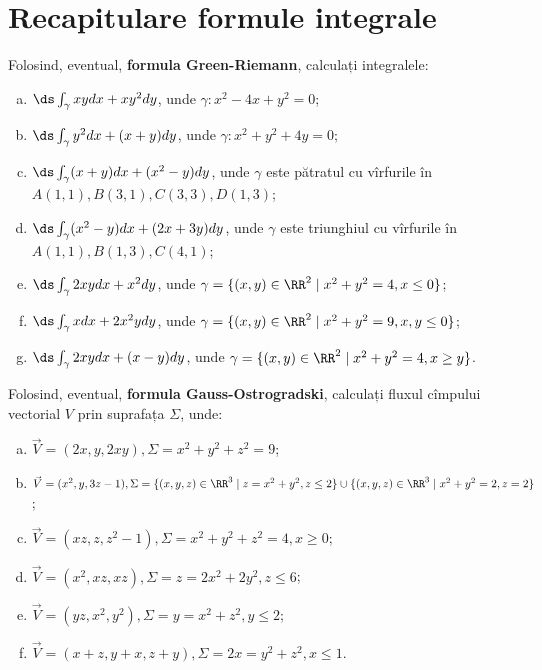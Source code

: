 
\chapter{Recapitulare formule integrale}

\indent\indent Folosind, eventual, \textbf{formula Green-Riemann}, calculați integralele:
\begin{enumerate}[(a)]
    \item $ \ds\int_\gamma xydx + xy^2 dy$, unde $ \gamma: x^2 - 4x + y^2 = 0 $;
    \item $ \ds\int_\gamma y^2 dx + (x + y) dy $, unde $ \gamma: x^2 + y^2 + 4y = 0 $;
    \item $ \ds\int_\gamma (x + y) dx + (x^2 - y) dy $, unde $ \gamma $ este pătratul cu vîrfurile în $ A(1,1), B(3,1), C(3,3), D(1,3) $;
    \item $ \ds\int_\gamma (x^2 - y) dx + (2x + 3y) dy $, unde $ \gamma $ este triunghiul cu vîrfurile în $ A(1, 1), B(1, 3), C(4,1) $;
    \item $ \ds\int_\gamma 2xydx + x^2 dy $, unde $ \gamma = \{ (x, y) \in \RR^2 \mid x^2 + y^2 = 4, x \leq 0 \} $;
    \item $ \ds\int_\gamma xdx + 2x^2y dy $, unde $ \gamma = \{ (x, y) \in \RR^2 \mid x^2 + y^2 = 9, x, y \leq 0 \} $;
    \item $ \ds\int_\gamma 2xydx + (x - y) dy $, unde $ \gamma = \{ (x, y) \in \RR^2 \mid x^2 + y^2 = 4, x \geq y \} $.
\end{enumerate}

\vspace{0.3cm}

Folosind, eventual, \textbf{formula Gauss-Ostrogradski}, calculați fluxul cîmpului vectorial $ V $
prin suprafața $ \Sigma $, unde:
\begin{enumerate}[(a)]
    \item $ \vec{V} = (2x, y, 2xy), \Sigma = x^2 + y^2 + z^2 = 9 $;
    \item $ \vec{V} = (x^2, y, 3z - 1), \Sigma = \{ (x, y, z) \in \RR^3 \mid z = x^2 + y^2, z \leq 2 \} \cup \{ (x, y, z) \in \RR^3 \mid x^2 + y^2 = 2, z = 2 \} $;
    \item $ \vec{V} = (xz, z, z^2 - 1), \Sigma = x^2 + y^2 + z^2 = 4, x \geq 0 $;
    \item $ \vec{V} = (x^2, xz, xz), \Sigma = z = 2x^2 + 2y^2, z \leq 6 $;
    \item $ \vec{V} = (yz, x^2, y^2), \Sigma = y = x^2 + z^2, y \leq 2 $;
    \item $ \vec{V} = (x + z, y + x, z + y), \Sigma = 2x = y^2 + z^2, x \leq 1 $.
\end{enumerate}

